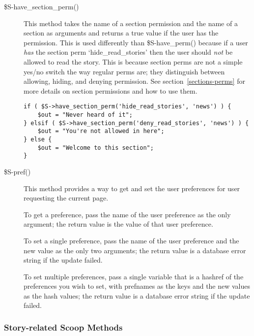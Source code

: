 \begin{description}
\item[\$S-\latexhtml{$>$}{>}have\_section\_perm()] This method takes the name of a section permission and the name of a section as arguments and returns a true value if the user has the permission. This is used differently than \$S-\latexhtml{$>$}{>}have\_perm() because if a user {\em has} the section perm `hide\_read\_stories' then the user should {\em not} be allowed to read the story. This is because section perms are not a simple yes/no switch the way regular perms are; they distinguish between allowing, hiding, and denying permission. See section~\ref{sections-perms} for more details on section permissions and how to use them.
\begin{verbatim}
if ( $S->have_section_perm('hide_read_stories', 'news') ) {
	$out = "Never heard of it";
} elsif ( $S->have_section_perm('deny_read_stories', 'news') ) {
	$out = "You're not allowed in here";
} else {
	$out = "Welcome to this section";
}
\end{verbatim}

\item[\$S-\latexhtml{$>$}{>}pref()] This method provides a way to get and set the user preferences for user requesting the current page. 

To get a preference, pass the name of the user preference as the only argument; the return value is the value of that user preference. 

To set a single preference, pass the name of the user preference and the new value as the only two arguments; the return value is a database error string if the update failed.

To set multiple preferences, pass a single variable that is a hashref of the preferences you wish to set, with prefnames as the keys and the new values as the hash values; the return value is a database error string if the update failed.

\end{description}

\subsubsection{Story-related Scoop Methods}

